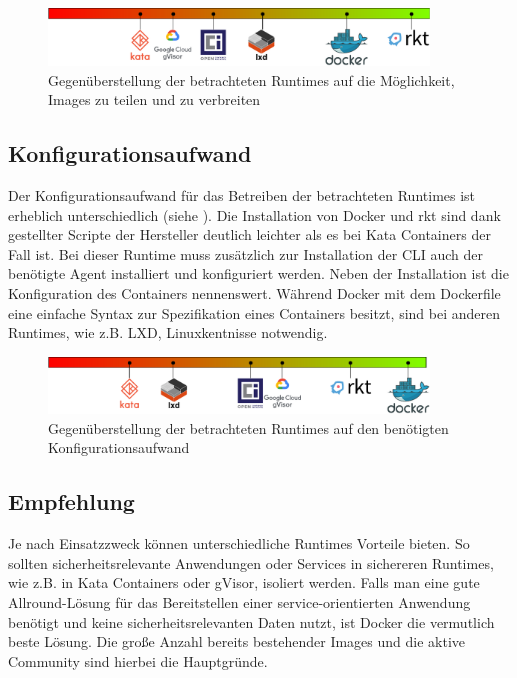 \begin{figure}[h]
	\begin{center}
		\includegraphics[width=0.9\textwidth]{bilder/rating-share.pdf}
		\caption{Gegenüberstellung der betrachteten Runtimes auf die Möglichkeit, Images zu teilen und zu verbreiten}
		\label{fig:compFazitShare}
	\end{center}
\end{figure}

\subsection{Konfigurationsaufwand}
\label{sec:compFazitConfig}

Der Konfigurationsaufwand für das Betreiben der betrachteten Runtimes ist erheblich unterschiedlich (siehe ). Die Installation von Docker und rkt sind dank gestellter Scripte der Hersteller deutlich leichter als es bei Kata Containers der Fall ist. Bei dieser Runtime muss zusätzlich zur Installation der CLI auch der benötigte Agent installiert und konfiguriert werden. Neben der Installation ist die Konfiguration des Containers nennenswert. Während Docker mit dem Dockerfile eine einfache Syntax zur Spezifikation eines Containers besitzt, sind bei anderen Runtimes, wie z.B. LXD, Linuxkentnisse notwendig. 

\begin{figure}[h]
	\begin{center}
		\includegraphics[width=0.9\textwidth]{bilder/rating-config.pdf}
		\caption{Gegenüberstellung der betrachteten Runtimes auf den benötigten Konfigurationsaufwand}
		\label{fig:comFazitConfig}
	\end{center}
\end{figure}

\subsection{Empfehlung}
\label{sec:compFazitEmpfehlung}

Je nach Einsatzzweck können unterschiedliche Runtimes Vorteile bieten. So sollten sicherheitsrelevante Anwendungen oder Services in sichereren Runtimes, wie z.B. in Kata Containers oder gVisor, isoliert werden. Falls man eine gute Allround-Lösung für das Bereitstellen einer service-orientierten Anwendung benötigt und keine sicherheitsrelevanten Daten nutzt, ist Docker die vermutlich beste Lösung. Die große Anzahl bereits bestehender Images und die aktive Community sind hierbei die Hauptgründe.
